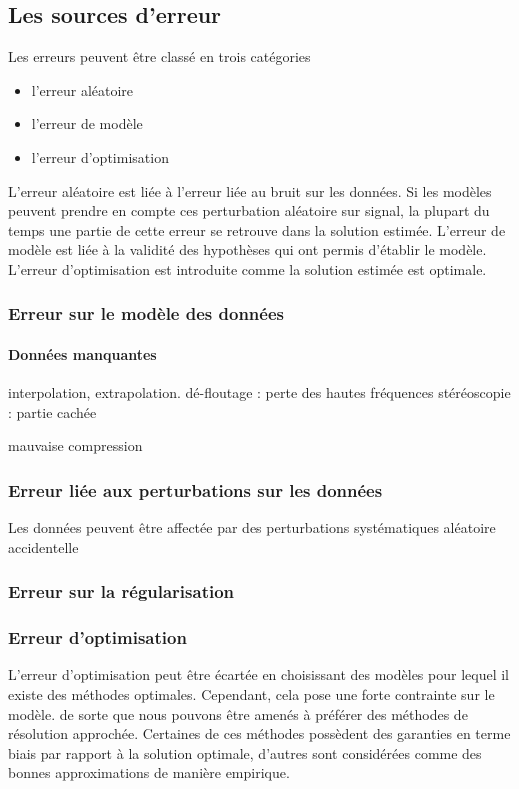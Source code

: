 \documentclass[../main/These_Mathias_Paget.tex]{subfiles}
\begin{document}
\subsection{Les sources d'erreur}

Les erreurs peuvent être classé en trois catégories
\begin{itemize}
\item l'erreur aléatoire
\item l'erreur de modèle
\item l'erreur d'optimisation
\end{itemize}

L'erreur aléatoire est liée à l'erreur liée au bruit sur les données. Si les modèles peuvent prendre en compte ces perturbation aléatoire sur signal, la plupart du temps une partie de cette erreur se retrouve dans la solution estimée. L'erreur de modèle est liée à la validité des hypothèses qui ont permis d'établir le modèle. L'erreur d'optimisation est introduite comme la solution estimée est optimale.

\subsubsection{Erreur sur le modèle des données}

\paragraph*{Données manquantes}
interpolation, extrapolation.
dé-floutage : perte des hautes fréquences
stéréoscopie : partie cachée

mauvaise compression


\subsubsection{Erreur liée aux perturbations sur les données}

Les données peuvent être affectée par des perturbations
systématiques
aléatoire
accidentelle


\subsubsection{Erreur sur la régularisation}




\subsubsection{Erreur d'optimisation}
	L'erreur d'optimisation peut être écartée en choisissant des modèles pour lequel il existe des méthodes optimales. Cependant, cela pose une forte contrainte sur le modèle. de sorte que nous pouvons être amenés à préférer des méthodes de résolution approchée. Certaines de ces méthodes possèdent des garanties en terme biais par rapport à la solution optimale, d'autres sont considérées comme des bonnes approximations de manière empirique.
	
\end{document}
